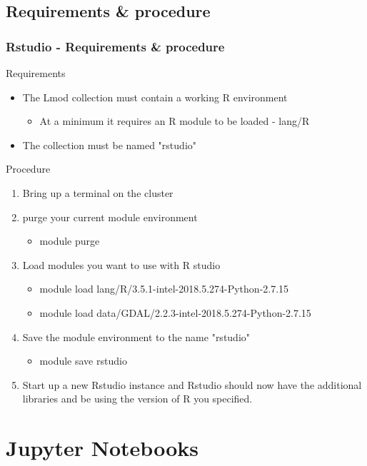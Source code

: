 \subsection[rstudioenv]{Requirements \& procedure}
\begin{frame}
	\frametitle{Rstudio - Requirements \& procedure}
	\begin{block}{Requirements}
		\begin{itemize}
			\item The Lmod collection must contain a working R environment
				\begin{itemize}
					\item At a minimum it requires an R module to be loaded - lang/R
				\end{itemize}
			\item The collection must be named "rstudio"
		\end{itemize}
	\end{block}
	\begin{block}{Procedure}
		\begin{enumerate}
			\item Bring up a terminal on the cluster
			\item purge your current module environment
				\begin{itemize}
				\item module purge
				\end{itemize}
			\item Load modules you want to use with R studio
				\begin{itemize}
				\item module load lang/R/3.5.1-intel-2018.5.274-Python-2.7.15 
				\item module load data/GDAL/2.2.3-intel-2018.5.274-Python-2.7.15
				\end{itemize}
			\item Save the module environment to the name "rstudio"
				\begin{itemize}
				\item module save rstudio
				\end{itemize}
			\item Start up a new Rstudio instance and Rstudio should now have the additional libraries and be using the version of R you specified.
		\end{enumerate}
	\end{block}
\end{frame}


\section[Jupyternote]{Jupyter Notebooks}

